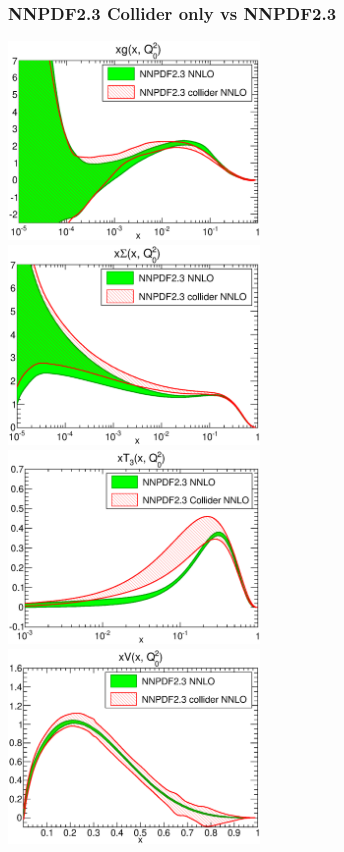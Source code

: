 \documentclass[10pt]{beamer}
\begin{document}
\begin{frame}
\frametitle{NNPDF2.3 Collider only vs NNPDF2.3}
   \includegraphics[width=0.5\textwidth]{figures/xg_Q_2_log-23-vs-23coll-nnlo.eps}
 \includegraphics[width=0.5\textwidth]{figures/xSinglet_Q_2_log-23-vs-23coll-nnlo.eps}\\
    \includegraphics[width=0.5\textwidth]{figures/xT3_Q_2_log-23-vs-23coll-nnlo.eps}
 \includegraphics[width=0.5\textwidth]{figures/xV_Q_2_lin-23-vs-23coll-nnlo.eps}
 \end{frame} 
\end{document}

